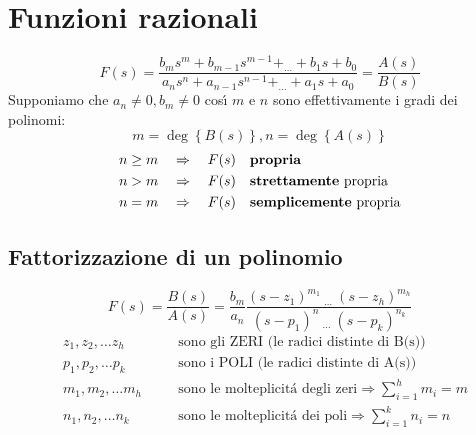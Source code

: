 \documentclass[../main.tex]{subfiles}
\begin{document}
	\section{Funzioni razionali}
	\[ F(s) = \frac{b_m s^m + b_{m-1} s^{m-1} + _{\dots} + b_1 s + b_0}{a_n s^n + a_{n-1} s^{n-1} + _{\dots} + a_1 s + a_0 } = \frac{A(s)}{B(s)} \]
	Supponiamo che $ a_n \neq 0, b_m \neq 0 $ cos\'{\i} $m$ e $n$ sono effettivamente i gradi dei polinomi: 
	$$ m = \deg\left\lbrace B(s) \right\rbrace, n=\deg \left\lbrace A(s) \right\rbrace $$
	\begin{align*}
		n \geq m \quad &\Rightarrow \quad F(s) \quad \text{\textbf{propria}}\\
		n > m \quad &\Rightarrow \quad F(s) \quad \text{\textbf{strettamente} propria}\\
		n = m \quad &\Rightarrow \quad F(s) \quad \text{\textbf{semplicemente} propria}
	\end{align*}
	\subsection{Fattorizzazione di un polinomio}
	\[ F(s) = \frac{B(s)}{A(s)} = \frac{b_m}{a_n} \frac{(s-z_1)^{m_1}\: _{\dots}\: (s-z_h)^{m_h}}{(s-p_1)^n\: _{\dots}\: (s-p_k)^{n_k}} \]
	\begin{align*}
		&z_1, z_2, \dots z_h \quad &&\text{sono gli ZERI (le radici distinte di B(s))}\\
		&p_1, p_2, \dots p_k \quad &&\text{sono i POLI (le radici distinte di A(s))}\\
		&m_1, m_2, \dots m_h \quad &&\text{sono le molteplicit\'{a} degli zeri} \Rightarrow \sum_{i=1}^{h}m_i = m\\
		&n_1, n_2, \dots n_k \quad &&\text{sono le molteplicit\'{a} dei poli} \Rightarrow \sum_{i=1}^{k}n_i = n\\
	\end{align*}
\end{document}
